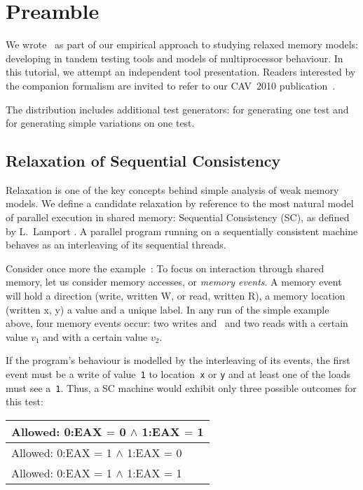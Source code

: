 
\section{Preamble} \label{preamble}

We wrote~\diy{} as part of our empirical approach to studying relaxed memory
models: developing in tandem testing tools and models of multiprocessor
behaviour.  In this tutorial, we attempt an independent tool presentation.
Readers interested by the companion formalism are invited
to refer to our CAV~2010 publication~\cite{ams10}.

The distribution includes additional test generators:
 for generating one test
and 
for generating simple variations on one test.

\subsection{Relaxation of Sequential Consistency}

Relaxation is one of the key concepts behind simple analysis of weak memory
models.  We define a candidate relaxation by reference to
the most natural model of
parallel execution in shared memory: Sequential Consistency (SC), as defined by
L.~Lamport \cite{lam79}. A parallel program running on a sequentially
consistent machine behaves as an interleaving of its sequential threads.

Consider once more the
example~:
 To focus on interaction through shared
memory, let us consider memory accesses, or \emph{memory events}.  A memory
event will hold a direction (write, written W, or read, written R), a memory
location (written x, y) a value and a unique label. In any run of the simple
example above, four memory events occur: two writes 
and~ and two reads  with a certain value $v_1$
and  with a certain value $v_2$.

If the program's
behaviour is modelled by the interleaving of its events, the first event must
be a write of value~\verb+1+ to location~\verb+x+ or \verb+y+ and at least one
of the loads must see a~\verb+1+. Thus, a SC machine would exhibit only three
possible outcomes for this test:

\begin{center}
\begin{tabular}{|l|}
\hline
Allowed: \mbox{0:EAX} $\mathord{=}$ \mbox{0} $\wedge$ \mbox{1:EAX} $\mathord{=}$ \mbox{1}\\\hline
Allowed: \mbox{0:EAX} $\mathord{=}$ \mbox{1} $\wedge$ \mbox{1:EAX} $\mathord{=}$ \mbox{0}\\\hline
Allowed: \mbox{0:EAX} $\mathord{=}$ \mbox{1} $\wedge$ \mbox{1:EAX} $\mathord{=}$ \mbox{1}\\\hline
\end{tabular}
\end{center}

